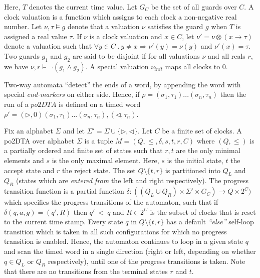 \documentclass{llncs}
\newcommand{\rend}{\triangleleft}
\newcommand{\lend}{\triangleright}
\newcommand{\potdta}{\mbox{$\mathit{po2DTA}$}}
\newcommand{\unite}{\otimes}
\begin{document}
Here, $T$ denotes the current time value. Let $G_C$ be the set of all guards over $C$. A clock valuation is a function which assigns to each clock a non-negative real number. Let $\nu,\tau\models g$ denote that a valuation $\nu$ satisfies the guard $g$ when $T$ is assigned a real value $\tau$. If $\nu$ is a clock valuation  and $x\in C$, let $\nu'=\nu\unite (x\to \tau)$ denote a valuation such that $\forall y\in C ~.~ y\neq x\Rightarrow \nu'(y)=\nu(y)$ and $\nu'(x)=\tau$. Two guards $g_1$ and $g_2$ are said to be disjoint if for all valuations $\nu$ and all reals $r$, 
we have $\nu,r\models \neg(g_1 \land g_2)$. A special valuation $\nu_{init}$ maps all clocks to 0.

Two-way automata ``detect'' the ends of a word, by appending the word with special \emph{end-markers} on either side. Hence, if $\rho = (\sigma_1,\tau_1) ...(\sigma_n,\tau_n)$ then the run of a \potdta\/ is defined on a timed word $\rho' = (\lend,0) (\sigma_1,\tau_1)... (\sigma_n,\tau_n),(\rend,\tau_n)$.

\begin{definition}[Syntax of \potdta]
Fix an alphabet $\Sigma$ and let $\Sigma' = \Sigma \cup \{\lend,\rend\}$. Let $C$ be a finite set of clocks. A po2DTA over alphabet $\Sigma$ is a tuple $M = (Q,\leq,\delta,s,t,r,C)$ where $(Q,\leq)$ is a partially
ordered and finite set of states such that $r,t$ are the only minimal elements and $s$ is the only maximal  element. Here, $s$ is the initial state, $t$ the accept state and $r$ the reject state. The set $Q \setminus \{t,r\}$ is partitioned into $Q_L$ and $Q_R$ (states which are \emph{entered from} the left and right respectively).  The progress transition function is a partial function $\delta: ((Q_L \cup Q_R)\times \Sigma' \times G_C) \to Q \times 2^C)$
which specifies the progress transitions of the automaton, such that if $\delta(q,a,g) = (q',R)$ then $q' ~<~ q$ and $R \in 2^C$ is the subset of clocks that is reset to the current time stamp.
Every state $q$ in $Q \setminus
\{t,r\}$ has a default \textit{``else''} self-loop transition which is taken in all
such configurations for which no progress transition is enabled. 
Hence, the automaton continues to loop in a given state $q$ and scan the timed word in a single direction (right or left, depending on whether $q\in Q_L$ or $Q_R$ respectively), until one of the progress transitions is taken. Note that there are no transitions from the terminal states $r$ and $t$. 

\end{definition}
\end{document}
